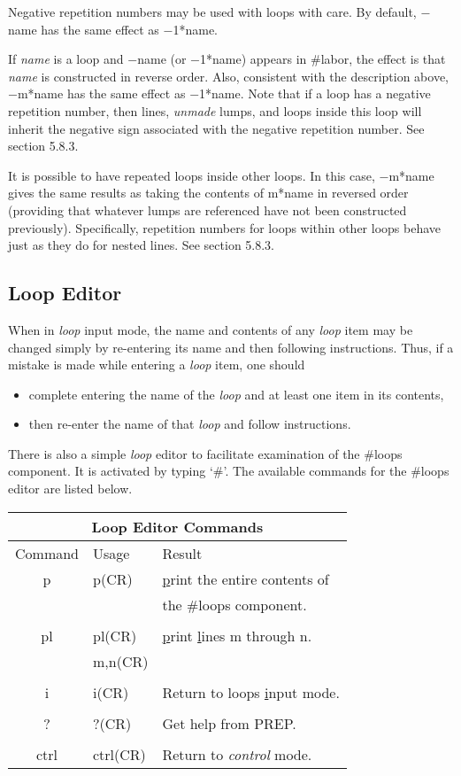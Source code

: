 Negative repetition numbers may be used with loops with care. By default,
$-$name has the same effect as $-$1*name.

If {\em name} is a loop and $-$name (or $-$1*name) appears in \#labor, the
effect is that {\em name} is constructed in reverse order. Also, consistent
with the description above, $-$m*name has the same effect as $-$1*name.
Note that if a loop has a negative repetition number, then lines, {\em
unmade} lumps, and loops inside this loop will inherit the negative sign
associated with the negative repetition number. See section 5.8.3.

It is possible to have repeated loops inside other loops. In this case,
$-$m*name gives the same results as taking the contents of m*name in
reversed order (providing that whatever lumps are referenced have not been
constructed previously). Specifically, repetition numbers for loops within
other loops behave just as they do for nested lines. See section 5.8.3.

\subsection{Loop Editor} When in {\em loop} input mode, the name and
contents of any {\em loop} item may be changed simply by re-entering its
name and then following instructions. Thus, if a mistake is made while
entering a {\em loop} item, one should
\begin{itemize} \item complete entering the name of the {\em loop} and at
least one item in its contents, \item then re-enter the name of that {\em
loop} and follow instructions.
\end{itemize}

There is also a simple {\em loop} editor to facilitate examination of the
\#loops component. It is activated by typing `\#'. The available commands
for the \#loops editor are listed below.

\begin{table}[hb]
\begin{center}
\begin{tabular}{|c|l|l|} \hline
\multicolumn{3}{|c|}{Loop Editor Commands}\\ \hline Command & Usage &
Result\\ \hline p & p(CR) & {\underline p}rint the entire contents of\\ & &
the \#loops component.\\ & &\\ pl & pl(CR) & {\underline p}rint {\underline
l}ines m through n.\\ & m,n(CR) &\\ & &\\ i & i(CR) & Return to loops
{\underline i}nput mode.\\ & &\\ ? & ?(CR) & Get help from PREP.\\ & &\\
ctrl & ctrl(CR) & Return to {\em control} mode.\\ \hline
\end{tabular}
\end{center}
\end{table}

